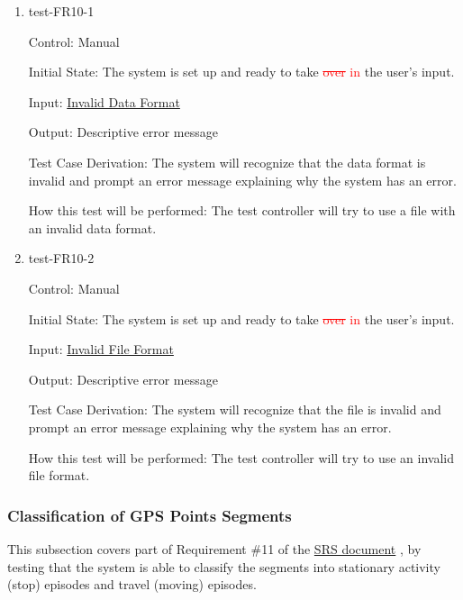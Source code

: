 \documentclass[12pt, titlepage]{article}
\begin{document}
\begin{enumerate}

\item{test-FR10-1\\} \label{test-FR10-1}

Control: Manual 
					
Initial State: The system is set up and ready to take \textcolor{red}{\sout{over} in} the user’s input.
					
Input: \href{https://github.com/paezha/PyERT-BLACK/blob/rev0-test/quarto-example/data/sample-gps/sample-gps-4.csv}{Invalid Data Format}
					
Output: Descriptive error message 

Test Case Derivation: The system will recognize that the data format is invalid and prompt an error message explaining why the system has an error.
					
How this test will be performed: The test controller will try to use a file with an invalid data format.
\\
\item{test-FR10-2\\} \label{test-FR10-2}

Control: Manual 
					
Initial State: The system is set up and ready to take \textcolor{red}{\sout{over} in} the user’s input.
					
Input: \href{https://github.com/paezha/PyERT-BLACK/blob/rev0-test/quarto-example/data/sample-gps/sample-gps-1.gpx}{Invalid File Format}
					
Output: Descriptive error message 

Test Case Derivation: The system will recognize that the file is invalid and prompt an error message explaining why the system has an error.
					
How this test will be performed: The test controller will try to use an invalid file format.

\end{enumerate}

\subsubsection{Classification of GPS Points Segments}

This subsection covers part of Requirement \#11 of the \href{https://github.com/paezha/PyERT-BLACK/blob/main/docs/SRS/SRS.pdf}{SRS document} \citep{SRS}, by testing that the system is able to classify the segments into stationary activity (stop) episodes and travel (moving) episodes.
\end{document}
